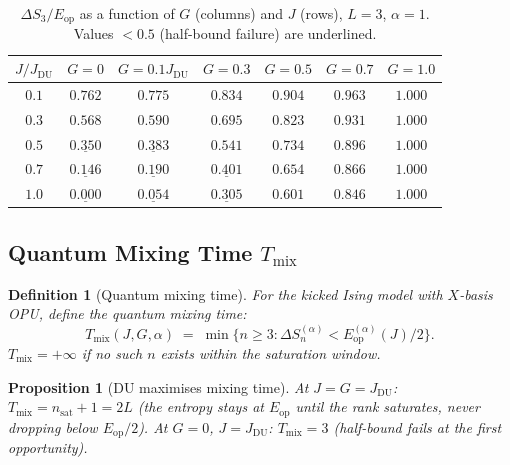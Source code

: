\documentclass[12pt,a4paper]{article}
\newtheorem{proposition}[theorem]{Proposition}
\newtheorem{definition}[theorem]{Definition}
\begin{document}
\begin{table}[h]
\centering
\caption{$\Delta S_3/E_\mathrm{op}$ as a function of $G$ (columns) and $J$ (rows), $L=3$, $\alpha=1$.
Values $<0.5$ (half-bound failure) are underlined.}
\label{tab:half_domain}
\begin{tabular}{c|cccccc}
\hline
$J/J_\mathrm{DU}$ & $G=0$ & $G=0.1J_\mathrm{DU}$ & $G=0.3$ & $G=0.5$ & $G=0.7$ & $G=1.0$ \\
\hline
$0.1$ & $0.762$ & $0.775$ & $0.834$ & $0.904$ & $0.963$ & $1.000$ \\
$0.3$ & $0.568$ & $0.590$ & $0.695$ & $0.823$ & $0.931$ & $1.000$ \\
$0.5$ & $\underline{0.350}$ & $\underline{0.383}$ & $0.541$ & $0.734$ & $0.896$ & $1.000$ \\
$0.7$ & $\underline{0.146}$ & $\underline{0.190}$ & $\underline{0.401}$ & $0.654$ & $0.866$ & $1.000$ \\
$1.0$ & $\underline{0.000}$ & $\underline{0.054}$ & $\underline{0.305}$ & $0.601$ & $0.846$ & $1.000$ \\
\hline
\end{tabular}
\end{table}

\subsection{Quantum Mixing Time $T_\mathrm{mix}$}
\label{subsec:tmix}

\begin{definition}[Quantum mixing time]\label{def:tmix}
For the kicked Ising model with $X$-basis OPU, define the \emph{quantum mixing time}:
\[
  T_\mathrm{mix}(J,G,\alpha)
  \;=\;\min\{n\geq3:\Delta S_n^{(\alpha)}<E_\mathrm{op}^{(\alpha)}(J)/2\}.
\]
$T_\mathrm{mix}=+\infty$ if no such $n$ exists within the saturation window.
\end{definition}

\begin{proposition}[DU maximises mixing time]\label{prop:du_tmix}
At $J=G=J_\mathrm{DU}$: $T_\mathrm{mix}=n_\mathrm{sat}+1=2L$ (the entropy stays at
$E_\mathrm{op}$ until the rank saturates, never dropping below $E_\mathrm{op}/2$).
At $G=0$, $J=J_\mathrm{DU}$: $T_\mathrm{mix}=3$ (half-bound fails at the first opportunity).
\end{proposition}
\end{document}
